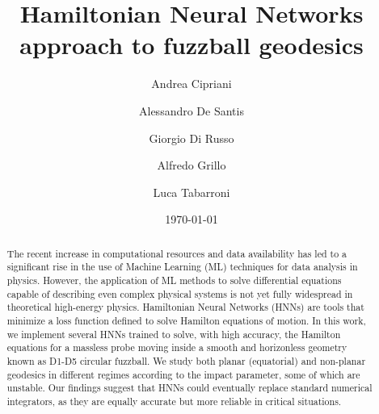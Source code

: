 \documentclass[prd,aps,a4paper,eqsecnum,nofootinbib,floatfix,twocolumn,superscriptaddress]{revtex4-2}
\begin{document}
\title{Hamiltonian Neural Networks approach to fuzzball geodesics}


\author{Andrea Cipriani}

\author{Alessandro De Santis}

\author{Giorgio Di Russo}

\author{Alfredo Grillo}

\author{Luca Tabarroni}



\date{\today}

\begin{abstract}
The recent increase in computational resources and data availability has led to a significant rise in the use of Machine Learning (ML) techniques for data analysis in physics. However, the application of ML methods to solve differential equations capable of describing even complex physical systems is not yet fully widespread in theoretical high-energy physics. Hamiltonian Neural Networks (HNNs) are tools that minimize a loss function defined to solve Hamilton equations of motion. In this work, we implement several HNNs trained to solve, with high accuracy, the Hamilton equations for a massless probe moving inside a smooth and horizonless geometry known as D1-D5 circular fuzzball. We study both planar (equatorial) and non-planar geodesics in different regimes according to the impact parameter, some of which are unstable. Our findings suggest that HNNs could eventually replace standard numerical integrators, as they are equally accurate but more reliable in critical situations.
\end{abstract}
\end{document}
